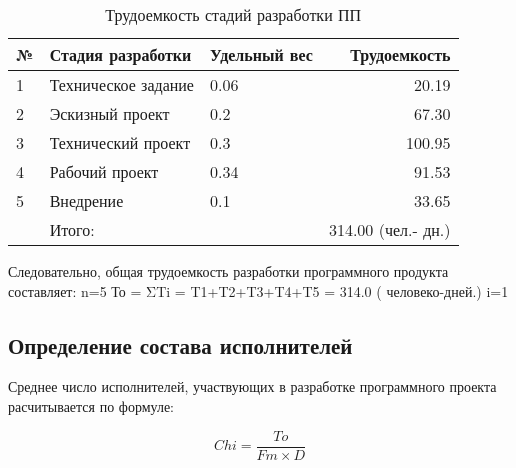 \begin{par}
\begin{table}
\caption{Трудоемкость стадий разработки ПП}
\begin{tabular}{|l|p{7cm}|p{4cm}|r|}
\hline{}
№ & Стадия разработки & Удельный вес & Трудоемкость \\
\hline{}
1 & Техническое задание & 0.06 &  20.19 \\
\hline{}
2 & Эскизный проект & 0.2 & 67.30 \\
\hline{}
3 & Технический проект & 0.3 & 100.95 \\
\hline{}
4 & Рабочий проект & 0.34 & 91.53 \\
\hline{}
5 & Внедрение & 0.1 & 33.65 \\
\hline{}
& Итого: & & 314.00 (чел.- дн.) \\
\hline
\end{tabular}
\label{table:trudo}
\end{table}
\end{par}



Следовательно, общая трудоемкость разработки программного продукта       составляет:
          n=5
То = ΣTi   =  T1+T2+T3+T4+T5 = 314.0 ( человеко-дней.)
        i=1



\subsection{Определение состава исполнителей}
Среднее число исполнителей, участвующих в разработке программного проекта расчитывается по формуле:

\begin{equation}
    Chi = \frac{To}{Fm \times{} D}
\end{equation}

